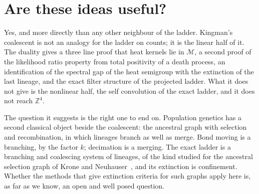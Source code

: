 \section{Are these ideas useful?}

Yes, and more directly than any other neighbour of the ladder. Kingman's coalescent is not an analogy for the ladder on counts; it is the linear half of it. The duality gives a three line proof that heat kernels lie in $\mathcal M$, a second proof of the likelihood ratio property from total positivity of a death process, an identification of the spectral gap of the heat semigroup with the extinction of the last lineage, and the exact filter structure of the projected ladder. What it does not give is the nonlinear half, the self convolution of the exact ladder, and it does not reach $\mathbb Z^4$.

The question it suggests is the right one to end on. Population genetics has a second classical object beside the coalescent: the ancestral graph with selection and recombination, in which lineages branch as well as merge. Bond moving is a branching, by the factor $k$; decimation is a merging. The exact ladder is a branching and coalescing system of lineages, of the kind studied for the ancestral selection graph of Krone and Neuhauser~\cite{KN97}, and its extinction is confinement. Whether the methods that give extinction criteria for such graphs apply here is, as far as we know, an open and well posed question.

